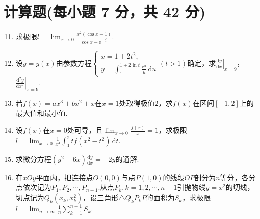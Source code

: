 \documentclass[../main.tex]{subfiles}
\begin{document}
\section{计算题(每小题 7 分，共 42 分)}
\begin{enumerate}
    \setcounter{enumi}{10}
    \item 求极限$l=\lim_{x\to0}\frac{x^{2}(\cos x-1)}{\cos x-\mathrm{e}^{-\frac{x^2}{2}}}$.
          \vspace{10em}

    \item 设$y=y(x)$由参数方程$\begin{cases}
                  x=1+2t^{2}, \\
                  y=\int_{1}^{1+2\ln t}\frac{\mathrm{e}^u}{u}\,\mathrm{d}u
              \end{cases}(t>1)$确定，求$\left.\frac{\mathrm{d}y}{\mathrm{d}x}\right|_{x=9}$，$\left
              .\frac{\mathrm{d}^{2}y}{\mathrm{d}x^{2}}\right|_{x=9}$.
          \vspace{10em}

    \item 若$f(x)=ax^{3}+bx^{2}+x$在$x=1$处取得极值$2$，求$f(x)$在区间$[-1,2
              ]$上的最大值和最小值.
          \vspace{10em}

    \item 设$f(x)$在$x=0$处可导，且$\lim_{x\to0}\frac{f(x)}{x}=1$，求极限$l=
              \lim_{x\to0}\frac{1}{x^{4}}\int_{0}^{x}tf(x^{2}-t^{2})\,\mathrm{d}t$.
          \vspace{10em}

    \item 求微分方程$(y^{2}-6x)\frac{\mathrm{d}y}{\mathrm{d}x}=-2y$的通解.
          \vspace{11em}

    \item 在$xOy$平面内，把连接点$O(0,0)$与点$P(1,0)$的线段$OP$剖分为$n$等分，各分点依次记为$P
                  _{1},P_{2},\cdots,P_{n-1}$.从点$P_{k},k=1,2,\cdots,n-1$引抛物线$y=x^{2}$的切线，切点记为$Q
                  _{k}(x_{k},x_{k}^{2})$，设三角形$\triangle Q_{k}P_{k}P$的面积为$S_{k}$，求极限$l
              =\lim_{n\to\infty}\frac{1}{n}\sum_{k=1}^{n-1}S_{k}$.
          \vspace{12em}
\end{enumerate}
\end{document}
